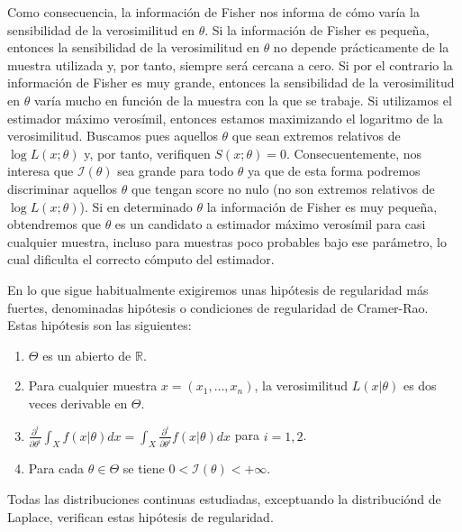 \documentclass{article}
\begin{document}
    Como consecuencia, la información de Fisher nos informa de cómo varía la sensibilidad de la verosimilitud en $\theta$. Si la información de Fisher es pequeña, entonces la sensibilidad de la verosimilitud en $\theta$ no depende prácticamente de la muestra utilizada y, por tanto, siempre será cercana a cero. Si por el contrario la información de Fisher es muy grande, entonces la sensibilidad de la verosimilitud en $\theta$ varía mucho en función de la muestra con la que se trabaje. Si utilizamos el estimador máximo verosímil, entonces estamos maximizando el logaritmo de la verosimilitud. Buscamos pues aquellos $\theta$ que sean extremos relativos de $\log L(x; \theta)$ y, por tanto, verifiquen $S(x; \theta) = 0$. Consecuentemente, nos interesa que $\mathcal{I}(\theta)$ sea grande para todo $\theta$ ya que de esta forma podremos discriminar aquellos $\theta$ que tengan score no nulo (no son extremos relativos de $\log L(x; \theta)$). Si en determinado $\theta$ la información de Fisher es muy pequeña, obtendremos que $\theta$ es un candidato a estimador máximo verosímil para casi cualquier muestra, incluso para muestras poco probables bajo ese parámetro, lo cual dificulta el correcto cómputo del estimador.

    En lo que sigue habitualmente exigiremos unas hipótesis de regularidad más fuertes, denominadas hipótesis o condiciones de regularidad de Cramer-Rao. Estas hipótesis son las siguientes:

    \begin{enumerate}[label=\roman*)]
        \item $\Theta$ es un abierto de $\mathbb{R}$.
        \item Para cualquier muestra $x = (x_1, \ldots, x_n)$, la verosimilitud $L(x | \theta)$ es dos veces derivable en $\Theta$.
        \item $\frac{\partial^i}{\partial\theta^i} \int_X f(x | \theta) dx = \int_X \frac{\partial^i}{\partial\theta^i} f(x | \theta) dx$ para $i=1,2$.
        \item Para cada $\theta \in \Theta$ se tiene $0 < \mathcal{I}(\theta) < +\infty$.
    \end{enumerate}

    Todas las distribuciones continuas estudiadas, exceptuando la distribuciónd de Laplace, verifican estas hipótesis de regularidad.
\end{document}
